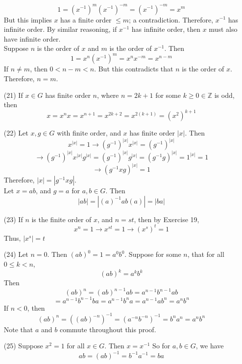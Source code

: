 \documentclass[12pt]{article}
\begin{document}
\begin{itemize}
$$1 = (x^{-1})^m(x^{-1})^{-m} = (x^{-1})^{-m} = x^m$$
But this implies $x$ has a finite order $\leq m$; a contradiction. Therefore, $x^{-1}$ has infinite order. By similar reasoning, if $x^{-1}$ has infinite order, then $x$ must also have infinite order. \\
Suppose $n$ is the order of $x$ and $m$ is the order of $x^{-1}$. Then
$$1 = x^n(x^{-1})^m = x^nx^{-m} = x^{n - m}$$
If $n \neq m$, then $0 < n - m < n$. But this contradicts that $n$ is the order of $x$. Therefore, $n = m$.
\item[(21)]
If $x \in G$ has finite order $n$, where $n = 2k + 1$ for some $k \geq 0 \in \mathbb{Z}$ is odd, then
$$x = x^nx = x^{n + 1} = x^{2k + 2} = x^{2(k + 1)} = (x^2)^{k + 1}$$
\item[(22)]
Let $x, g \in G$ with finite order, and $x$ has finite order $|x|$. Then
$$x^{|x|} = 1 \rightarrow (g^{-1})^{|x|}x^{|x|} = (g^{-1})^{|x|}$$
$$\rightarrow (g^{-1})^{|x|}x^{|x|}g^{|x|} = (g^{-1})^{|x|}g^{|x|} = (g^{-1}g)^{|x|} = 1^{|x|} = 1$$
$$\rightarrow (g^{-1}xg)^{|x|} = 1$$
Therefore, $|x| = |g^{-1}xg|$. \\
Let $x = ab$, and $g = a$ for $a, b \in G$. Then
$$|ab| = |(a)^{-1}ab(a)| = |ba|$$
\item[(23)]
If $n$ is the finite order of $x$, and $n = st$, then by Exercise 19,
$$x^n = 1 \rightarrow x^{st} = 1 \rightarrow (x^s)^t = 1$$
Thus, $|x^s| = t$
\item[(24)] Let $n = 0$. Then $(ab)^0 = 1 = a^0b^0$. Suppose for some $n$, that for all $0 \leq k < n$,
$$(ab)^k = a^kb^k$$
Then
$$(ab)^n = (ab)^{n - 1}ab = a^{n-1}b^{n-1}ab$$
$$= a^{n-1}b^{n-1}ba = a^{n-1}b^na = a^{n-1}ab^n = a^nb^n$$
If $n < 0$, then
$$(ab)^n = ((ab)^{-n})^{-1} = (a^{-n}b^{-n})^{-1} = b^na^n = a^nb^n$$
Note that $a$ and $b$ commute throughout this proof.
\item[(25)]
Suppose $x^2 = 1$ for all $x \in G$. Then $x = x^{-1}$ So for $a, b \in G$, we have
$$ab = (ab)^{-1} = b^{-1}a^{-1} = ba$$
\end{itemize}
\end{document}
